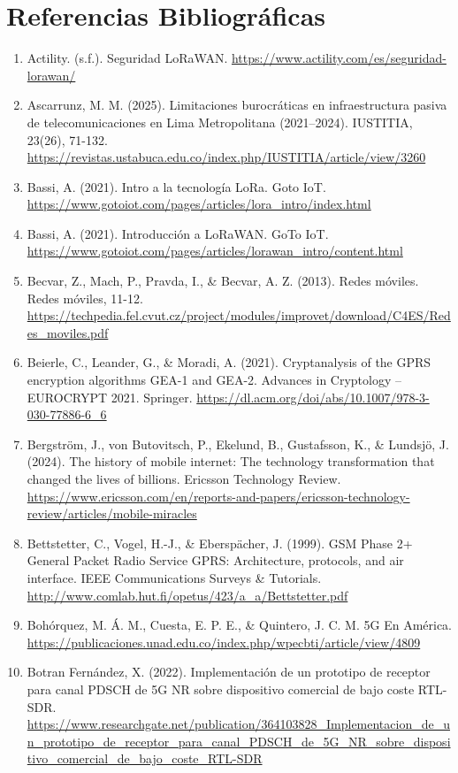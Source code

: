 \documentclass[12pt,a4paper]{article}
\begin{document}
	\pagebreak
	\section{Referencias Bibliográficas}

	\begin{enumerate}
    \item Actility. (s.f.). Seguridad LoRaWAN. \url{https://www.actility.com/es/seguridad-lorawan/}
    \item Ascarrunz, M. M. (2025). Limitaciones burocráticas en infraestructura pasiva de telecomunicaciones en Lima Metropolitana (2021–2024). IUSTITIA, 23(26), 71-132. \url{https://revistas.ustabuca.edu.co/index.php/IUSTITIA/article/view/3260}
    \item Bassi, A. (2021). Intro a la tecnología LoRa. Goto IoT. \url{https://www.gotoiot.com/pages/articles/lora_intro/index.html}
    \item Bassi, A. (2021). Introducción a LoRaWAN. GoTo IoT. \url{https://www.gotoiot.com/pages/articles/lorawan_intro/content.html}
    \item Becvar, Z., Mach, P., Pravda, I., \& Becvar, A. Z. (2013). Redes móviles. Redes móviles, 11-12. \url{https://techpedia.fel.cvut.cz/project/modules/improvet/download/C4ES/Redes_moviles.pdf}
    \item Beierle, C., Leander, G., \& Moradi, A. (2021). Cryptanalysis of the GPRS encryption algorithms GEA-1 and GEA-2. Advances in Cryptology – EUROCRYPT 2021. Springer. \url{https://dl.acm.org/doi/abs/10.1007/978-3-030-77886-6_6}
    \item Bergström, J., von Butovitsch, P., Ekelund, B., Gustafsson, K., \& Lundsjö, J. (2024). The history of mobile internet: The technology transformation that changed the lives of billions. Ericsson Technology Review. \url{https://www.ericsson.com/en/reports-and-papers/ericsson-technology-review/articles/mobile-miracles}
    \item Bettstetter, C., Vogel, H.-J., \& Eberspächer, J. (1999). GSM Phase 2+ General Packet Radio Service GPRS: Architecture, protocols, and air interface. IEEE Communications Surveys \& Tutorials. \url{http://www.comlab.hut.fi/opetus/423/a_a/Bettstetter.pdf}
    \item Bohórquez, M. Á. M., Cuesta, E. P. E., \& Quintero, J. C. M. 5G En América. \url{https://publicaciones.unad.edu.co/index.php/wpecbti/article/view/4809}
    \item Botran Fernández, X. (2022). Implementación de un prototipo de receptor para canal PDSCH de 5G NR sobre dispositivo comercial de bajo coste RTL-SDR. \url{https://www.researchgate.net/publication/364103828_Implementacion_de_un_prototipo_de_receptor_para_canal_PDSCH_de_5G_NR_sobre_dispositivo_comercial_de_bajo_coste_RTL-SDR}

\end{enumerate}
\end{document}
